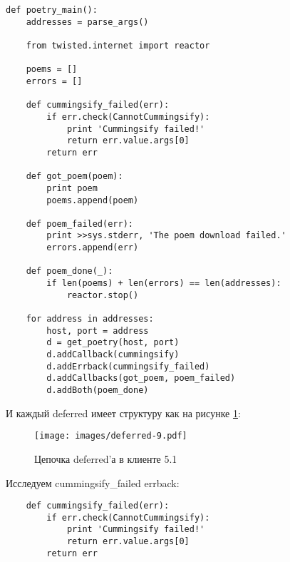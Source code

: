  \begin{verbatim}
def poetry_main():
    addresses = parse_args()

    from twisted.internet import reactor

    poems = []
    errors = []

    def cummingsify_failed(err):
        if err.check(CannotCummingsify):
            print 'Cummingsify failed!'
            return err.value.args[0]
        return err

    def got_poem(poem):
        print poem
        poems.append(poem)

    def poem_failed(err):
        print >>sys.stderr, 'The poem download failed.'
        errors.append(err)

    def poem_done(_):
        if len(poems) + len(errors) == len(addresses):
            reactor.stop()

    for address in addresses:
        host, port = address
        d = get_poetry(host, port)
        d.addCallback(cummingsify)
        d.addErrback(cummingsify_failed)
        d.addCallbacks(got_poem, poem_failed)
        d.addBoth(poem_done)
\end{verbatim} 

И каждый deferred имеет структуру как на рисунке \ref{fig:deferred-9}:
 
\begin{figure}[h]
\begin{center}
    \texttt{[image: images/deferred-9.pdf]}
    \caption{Цепочка deferred'а в клиенте 5.1\label{fig:deferred-9}}
\end{center}
\end{figure}

Исследуем cummingsify\_failed errback:

 \begin{verbatim}
    def cummingsify_failed(err):
        if err.check(CannotCummingsify):
            print 'Cummingsify failed!'
            return err.value.args[0]
        return err
\end{verbatim} 


